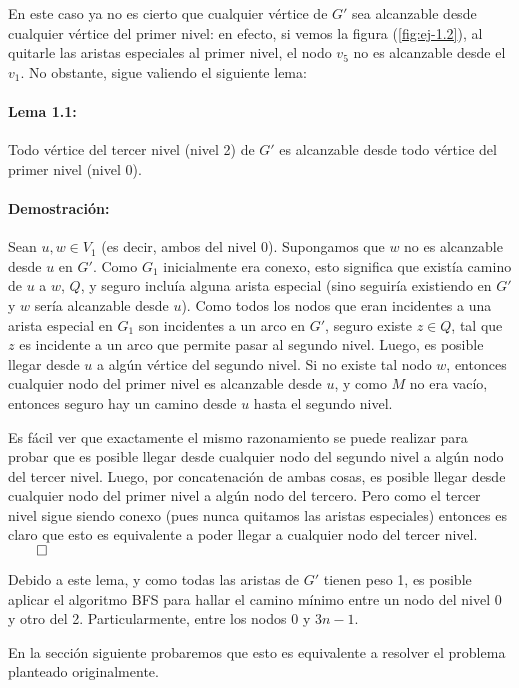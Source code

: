 En este caso ya no es cierto que cualquier vértice de $G'$ sea alcanzable desde cualquier vértice del primer nivel: en efecto, si vemos la figura (\ref{fig:ej-1.2}), al quitarle las aristas especiales al primer nivel, el nodo $v_5$ no es alcanzable desde el $v_1$. No obstante, sigue valiendo el siguiente lema:

\paragraph*{Lema 1.1: }Todo vértice del tercer nivel (nivel 2) de $G'$ es alcanzable desde todo vértice del primer nivel (nivel 0). 

\paragraph*{Demostración: }Sean $u,w\in V_1$ (es decir, ambos del nivel 0). Supongamos que $w$ no es alcanzable desde $u$ en $G'$. Como $G_1$ inicialmente era conexo, esto significa que existía camino de $u$ a $w$, $Q$, y seguro incluía alguna arista especial (sino seguiría existiendo en $G'$ y $w$ sería alcanzable desde $u$). Como todos los nodos que eran incidentes a una arista especial en $G_1$ son incidentes a un arco en $G'$, seguro existe $z\in Q$, tal que $z$ es incidente a un arco que permite pasar al segundo nivel. Luego, es posible llegar desde $u$ a algún vértice del segundo nivel. Si no existe tal nodo $w$, entonces cualquier nodo del primer nivel es alcanzable desde $u$, y como $M$ no era vacío, entonces seguro hay un camino desde $u$ hasta el segundo nivel.

Es fácil ver que exactamente el mismo razonamiento se puede realizar para probar que es posible llegar desde cualquier nodo del segundo nivel a algún nodo del tercer nivel. Luego, por concatenación de ambas cosas, es posible llegar desde cualquier nodo del primer nivel a algún nodo del tercero. Pero como el tercer nivel sigue siendo conexo (pues nunca quitamos las aristas especiales) entonces es claro que esto es equivalente a poder llegar a cualquier nodo del tercer nivel. $\qed$

Debido a este lema, y como todas las aristas de $G'$ tienen peso 1, es posible aplicar el algoritmo BFS para hallar el camino mínimo entre un nodo del nivel 0 y otro del 2. Particularmente, entre los nodos 0 y $3n-1$. 

En la sección siguiente probaremos que esto es equivalente a resolver el problema planteado originalmente.

